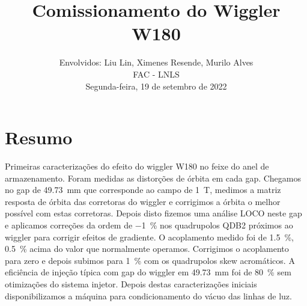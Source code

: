 \documentclass[a4paper,
               keeplastbox,   %
               ]{jacow}
\begin{document}
\title{Comissionamento do Wiggler W180}

\author{Envolvidos: Liu Lin, Ximenes Resende, Murilo Alves \\ FAC - LNLS \\ Segunda-feira, 19 de setembro de 2022}
\maketitle
%
\section{Resumo}
Primeiras caracterizações do efeito do wiggler W180 no feixe do anel de armazenamento. Foram medidas as distorções de órbita em cada gap. Chegamos no gap de \SI{49.73}{\milli\meter} que corresponde ao campo de \SI{1}{\tesla}, medimos a matriz resposta de órbita das corretoras do wiggler e corrigimos a órbita o melhor possível com estas corretoras. Depois disto fizemos uma análise LOCO neste gap e aplicamos correções da ordem de \SI{-1}{\percent} nos quadrupolos QDB2 próximos ao wiggler para corrigir efeitos de gradiente. O acoplamento medido foi de \SI{1.5}{\percent}, \SI{0.5}{\percent} acima do valor que normalmente operamos. Corrigimos o acoplamento para zero e depois subimos para \SI{1}{\percent} com os quadrupolos skew acromáticos. A eficiência de injeção típica com gap do wiggler em \SI{49.73}{\milli\meter} foi de \SI{80}{\percent} sem otimizações do sistema injetor. Depois destas caracterizações iniciais disponibilizamos a máquina para condicionamento do vácuo das linhas de luz. 
\end{document}
